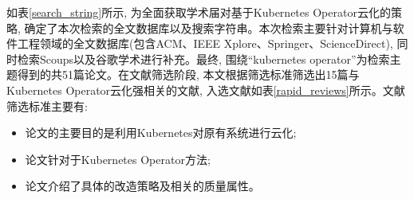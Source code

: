 如表\ref{search_string}所示, 为全面获取学术届对基于Kubernetes Operator云化的策略, 确定了本次检索的全文数据库以及搜索字符串。本次检索主要针对计算机与软件工程领域的全文数据库\cite{lisboa2010systematic}(包含ACM、IEEE Xplore、Springer、ScienceDirect), 同时检索Scoups以及谷歌学术进行补充。最终, 围绕“kubernetes operator”为检索主题得到的共51篇论文。在文献筛选阶段, 本文根据筛选标准筛选出15篇与Kubernetes Operator云化强相关的文献, 入选文献如表\ref{rapid_reviews}所示。文献筛选标准主要有:

\begin{itemize}[itemindent=2em]
    \item 论文的主要目的是利用Kubernetes对原有系统进行云化;

    \item 论文针对于Kubernetes Operator方法;

    \item 论文介绍了具体的改造策略及相关的质量属性。
\end{itemize}

